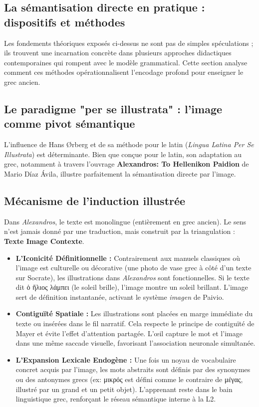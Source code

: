 \subsection{La sémantisation directe en pratique : dispositifs et méthodes}

Les fondements théoriques exposés ci-dessus ne sont pas de simples spéculations ; ils trouvent une
incarnation concrète dans plusieurs approches didactiques contemporaines qui rompent avec le modèle
grammatical. Cette section analyse comment ces méthodes opérationnalisent l'encodage profond pour
enseigner le grec ancien.



\subsection{Le paradigme "per se illustrata" : l'image comme pivot sémantique}

L'influence de Hans Ørberg et de sa méthode pour le latin (\textit{Lingua Latina Per Se Illustrata})
est déterminante. Bien que conçue pour le latin, son adaptation au grec, notamment à travers
l'ouvrage \textbf{\og Alexandros: To Hellenikon Paidion\fg{}} de Mario Díaz Ávila, illustre
parfaitement la sémantisation directe par l'image.\cite{III-1-3-ref39}



\subsection{Mécanisme de l'induction illustrée}

Dans \textit{Alexandros}, le texte est monolingue (entièrement en grec ancien). Le sens n'est jamais
donné par une traduction, mais construit par la triangulation : \textbf{Texte \- Image \- Contexte}.

\begin{itemize}\item \textbf{L'Iconicité Définitionnelle :} Contrairement aux manuels classiques où l'image est culturelle ou décorative (une photo de vase grec à côté d'un texte sur Socrate), les illustrations dans \textit{Alexandros} sont fonctionnelles. Si le texte dit ὁ ἥλιος λάμπει (le soleil brille), l'image montre un soleil brillant. L'image sert de définition instantanée, activant le système \textit{imagen} de Paivio.\cite{III-1-3-ref42}\item \textbf{Contiguïté Spatiale :} Les illustrations sont placées en marge immédiate du texte ou insérées dans le fil narratif. Cela respecte le principe de contiguïté de Mayer et évite l'effet d'attention partagée.\cite{III-1-3-ref14} L'œil capture le mot et l'image dans une même saccade visuelle, favorisant l'association neuronale simultanée.\item \textbf{L'Expansion Lexicale Endogène :} Une fois un noyau de vocabulaire concret acquis par l'image, les mots abstraits sont définis par des synonymes ou des antonymes grecs (ex: μικρός est défini comme le contraire de μέγας, illustré par un grand et un petit objet). L'apprenant reste dans le \og bain\fg{} linguistique grec, renforçant le réseau sémantique interne à la L2.\cite{III-1-3-ref44}\end{itemize}

